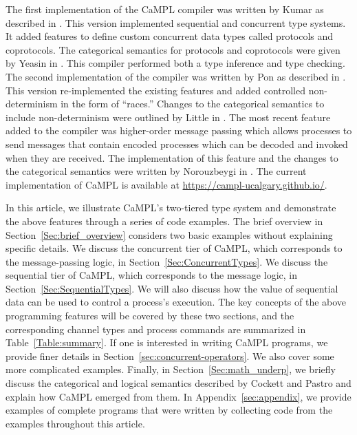 \documentclass[acmsmall]{acmart}
\begin{document}
The first implementation of the CaMPL compiler was written by Kumar as described in \cite{Ku18}.
This version implemented sequential and concurrent type systems.
It added features to define custom concurrent data types called protocols and coprotocols.
The categorical semantics for protocols and coprotocols were given by Yeasin in \cite{Ye12}.
This compiler performed both a type inference and type checking.
The second implementation of the compiler was written by Pon as described in \cite{Po21, Po22}.
This version re-implemented the existing features and added controlled non-determinism in the form of ``races.''
Changes to the categorical semantics to include non-determinism were outlined by Little in \cite{xanna, xanna2}.
The most recent feature added to the compiler was higher-order message passing which allows processes to send messages that contain encoded processes which can be decoded and invoked when they are received.
The implementation of this feature and the changes to the categorical semantics were written by Norouzbeygi in \cite{No25, Cockett_2026}. 
The current implementation of CaMPL is available at \url{https://campl-ucalgary.github.io/}.

In this article, we illustrate CaMPL's two-tiered type system and demonstrate the above features through a series of code examples.
The brief overview in Section~\ref{Sec:brief_overview} considers two basic examples without explaining specific details.
We discuss the concurrent tier of CaMPL, which corresponds to the message-passing logic, in Section~\ref{Sec:ConcurrentTypes}.
We discuss the sequential tier of CaMPL, which corresponds to the message logic, in Section~\ref{Sec:SequentialTypes}.
We will also discuss how the value of sequential data can be used to control a process's execution.
The key concepts of the above programming features will be covered by these two sections, and the corresponding channel types and process commands are summarized in Table~\ref{Table:summary}.
If one is interested in writing CaMPL programs, we provide finer details in Section~\ref{sec:concurrent-operators}.
We also cover some more complicated examples.
Finally, in Section~\ref{Sec:math_underp}, we briefly discuss  the categorical and logical semantics described by Cockett and Pastro and explain how CaMPL emerged from them.
In Appendix~\ref{sec:appendix}, we provide examples of complete programs that were written by collecting code from the examples throughout this article.
\end{document}
